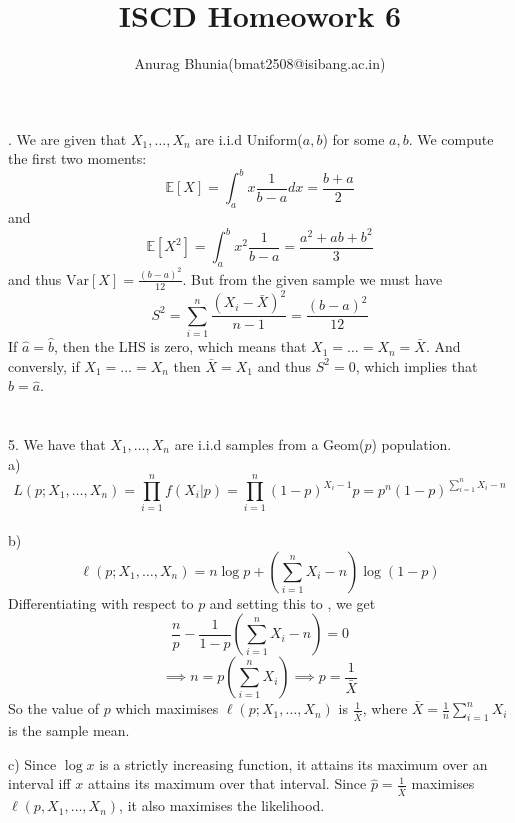 \documentclass{article}
\title{ISCD Homeowork 6}
\author{
\begin{tabular}{c}
Anurag Bhunia(bmat2508@isibang.ac.in)\\[0.6em]
\end{tabular}
}
\date{}
\begin{document}
. We are given that $X_1,\dots,X_n$ are i.i.d Uniform($a,b$) for some $a,b$. We compute the first two moments: 
$$\mathbb{E}[X]=\int_a^b x\frac{1}{b-a}dx=\frac{b+a}{2}$$
and 
$$\mathbb{E}[X^2]=\int_a^b x^2\frac{1}{b-a}=\frac{a^2 +ab+b^2}{3}$$
and thus $\text{Var}[X]=\frac{(b-a)^2}{12}$. But from the given sample we must have
$$S^2=\sum_{i=1}^{n}\frac{(X_i - \bar{X})^2}{n-1}=\frac{(b-a)^2}{12}$$
If $\hat{a}=\hat{b}$, then the LHS is zero, which means that $X_1=\dots=X_n=\bar{X}$. And conversly, if $X_1=\dots=X_n$ then $\bar{X}=X_1$ and thus $S^2=0$, which implies that $\hat{b}=\hat{a}$.
\\
\\
\\
5. We have that $X_1,\dots,X_n$ are i.i.d samples from a Geom($p$) population. \\
a) $$L(p;X_1,\dots,X_n)=\prod_{i=1}^{n}f(X_i|p)=\prod_{i=1}^{n}(1-p)^{X_i-1}p=p^n (1-p)^{\sum_{i=1}^{n}X_i-n}$$ 
\\
b) $$\ell(p;X_1,\dots,X_n)=n\log{p}+\left(\sum_{i=1}^n X_i -n\right)\log{(1-p)}$$
Differentiating with respect to $p$ and setting this to , we get
$$\frac{n}{p}-\frac{1}{1-p}\left(\sum_{i=1}^n X_i -n\right)=0$$
$$\implies n=p\left(\sum_{i=1}^n X_i\right)\implies p=\frac{1}{\bar{X}}$$
So the value of $p$ which maximises $\ell(p;X_1,\dots,X_n)$ is $\frac{1}{\bar{X}}$, where $\bar{X}=\frac{1}{n}\sum_{i=1}^n X_i$ is the sample mean.

c) Since $\log{x}$ is a strictly increasing function, it attains its maximum over an interval iff $x$ attains its maximum over that interval. Since $\hat{p}=\frac{1}{\bar{X}}$ maximises $\ell(p,X_1,\dots,X_n)$, it also maximises the likelihood.
\end{document}
